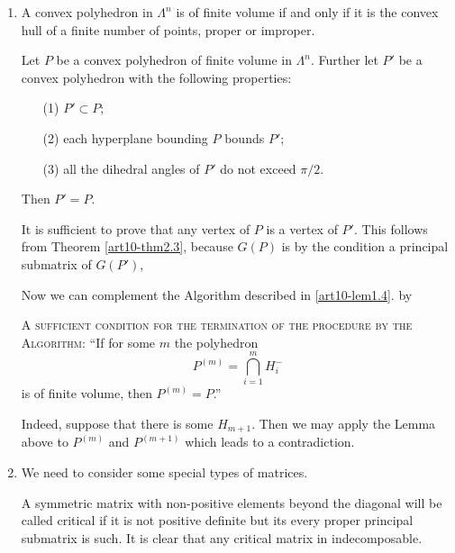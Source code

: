 \begin{enumerate}
In the\pageoriginale case when $P$ is a cell of a d.r.g. $\Gamma$, the matrix $G_S$ is positive definite (\resp parabolic) if and only if the corresponding subdiagram of the Coxeter's diagram $\Sigma (\Gamma)$ is elliptic (\resp parabolic) in the sense of 1.2. The rank of $G_S$ coincides with the rank of the corresponding subdiagram. If $S = b(F)$, the subgroup $\Gamma_S$ of $\Gamma$, generated by reflections $R_i$ with $i \in S$, is the stable subgroup of any interior point of $F$.

\item A convex polyhedron in $\Lambda^n$ is of finite volume if and only if it is the convex hull of a finite number of points, proper or improper. 

\setcounter{lemma}{3}
\begin{lemma}\label{art10-lem2.4}
Let $P$ be a convex polyhedron of finite volume in $\Lambda^n$. Further let $P'$ be a convex polyhedron with the following properties:
\begin{itemize}
\item[(1)] $P' \subset P$;

\item[(2)] each hyperplane bounding $P$ bounds $P'$;

\item[(3)] all the dihedral angles of $P'$ do not exceed $\pi/2$.
\end{itemize}
Then $P'=P$.
\end{lemma}

It is sufficient to prove that any vertex of $P$ is a vertex of $P'$. This follows from Theorem \ref{art10-thm2.3}, because $G(P)$ is by the condition a principal submatrix of $G(P')$,

Now we can complement the Algorithm described in \ref{art10-lem1.4}. by 

\textsc{A sufficient condition for the termination of the procedure by the Algorithm:} ``If for some $m$ the polyhedron
$$
P^{(m)} = \bigcap\limits^m_{i=1} H^-_i
$$
is of finite volume, then $P^{(m)} = P$.''

Indeed, suppose that there is some $H_{m+1}$. Then we may apply the Lemma above to $P^{(m)}$ and $P^{(m+1)}$ which leads to a contradiction. 

\item We need to consider some special types of matrices. 

A symmetric matrix with non-positive elements beyond the diagonal will be called critical if it is not positive definite but its every proper principal submatrix is such. It is clear that any critical matrix in indecomposable.


\end{enumerate}
